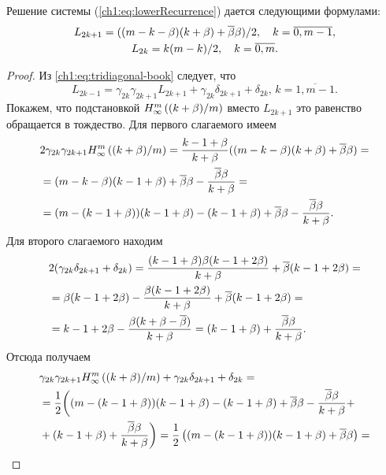 {\begin{proposition}
  \label{ch1:prop:lower:recurrence-solution}
  Решение системы {\normalfont(\ref{ch1:eq:lowerRecurrence})} дается
  следующими формулами\textup{:}
  \begin{gather}
    \label{ch1:eq:recurrence-solution:odd}
    L_{2k+1} = ((m - k - \beta)(k + \beta) + {\overline{\beta}}\beta)/2, \quad k = \overline{0, m-1},\\
    \label{ch1:eq:recurrence-solution:even}
    L_{2k} = k (m-k)/2, \quad k = \overline{0, m}.
  \end{gather}
\end{proposition}
\begin{proof}
  Из \eqref{ch1:eq:tridiagonal-book} следует, что
  \begin{equation*}
    L_{2k-1} = \gamma_{2k}\gamma_{2k+1}L_{2k+1} + \gamma_{2k}\delta_{2k+1} + \delta_{2k}, \, k = \overline{1, m-1}.
  \end{equation*}
  Покажем, что подстановкой $H_{\infty}^m\left({(k+\beta)/m}\right)$ вместо $L_{2k+1}$ это равенство обращается в тождество.
  Для первого слагаемого имеем
  \begin{align*}
    &2 \gamma_{2k} \gamma_{2k+1} H_{\infty}^m\left({(k+\beta)/m}\right) =
      \frac{k-1+\beta}{k+\beta} ((m-k-\beta)(k+\beta) + {\overline{\beta}} \beta) = \\
    &=
      (m-k-\beta)(k-1+\beta) + {\overline{\beta}} \beta - \frac{{\overline{\beta}}\beta}{k+\beta} = \\
    &=
      (m-(k-1+\beta))(k-1+\beta) - (k-1+\beta) + {\overline{\beta}} \beta - \frac{{\overline{\beta}}\beta}{k+\beta}.
  \end{align*}
  Для второго слагаемого находим
  \begin{align*}
    &2(\gamma_{2k} \delta_{2k+1} + \delta_{2k}) 
    = \frac{(k-1+\beta)\beta(k-1+2\beta)}{k+\beta} + {\overline{\beta}}(k-1+2\beta) = \\
    &= \beta (k-1+2\beta) - \frac{\beta (k-1+2\beta)}{k+\beta} + {\overline{\beta}} (k-1+2\beta) = \\
    &= k - 1 + 2\beta - \frac{\beta(k+\beta-{\overline{\beta}})}{k+\beta} = (k-1+\beta) + \frac{{\overline{\beta}}\beta}{k+\beta}.
  \end{align*}
  Отсюда получаем
  \begin{align*}
    &\gamma_{2k} \gamma_{2k+1} \upperBound{(k+\Co)/m} + \gamma_{2k} \delta_{2k+1} + \delta_{2k} = \\
    &= \frac{1}{2}\biggl(
    (m-(k-1+\Co))(k-1+\Co) -
    (k-1+\Co) + \DCo \Co - \frac{\DCo\Co}{k+\Co} + \\
    &+ (k-1+\Co) + \frac{\DCo\Co}{k+\Co}
    \biggr) =
    \frac{1}{2} \left(
    (m-(k-1+\Co))(k-1+\Co) + \DCo\Co
    \right) =\\

\end{align*}
\end{proof}}
